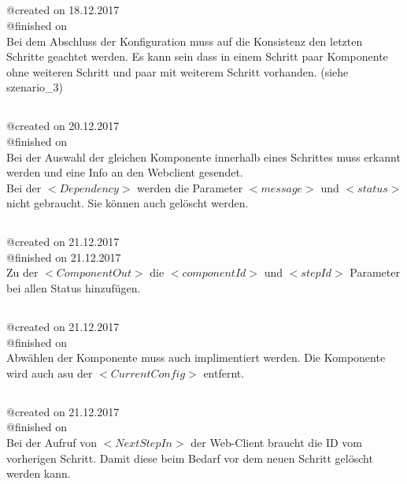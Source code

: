 \documentclass{article}
\begin{document}
\subsection{}
@created on 18.12.2017\\
@finished on \\

Bei dem Abschluss der Konfiguration muss auf die Konsistenz den letzten
Schritte geachtet werden. Es kann sein dass in einem Schritt paar Komponente
ohne weiteren Schritt und paar mit weiterem Schritt vorhanden. (siehe
szenario\_3)\\

\subsection{}
@created on 20.12.2017\\
@finished on \\

Bei der Auswahl der gleichen Komponente innerhalb eines Schrittes muss erkannt
werden und eine Info an den Webclient gesendet.\\

Bei der $<Dependency>$ werden die Parameter $<message>$ und $<status>$ nicht
gebraucht. Sie k\"onnen auch gel\"oscht werden.\\

\subsection{}
@created on 21.12.2017\\
@finished on 21.12.2017\\

Zu der $<ComponentOut>$ die $<componentId>$ und $<stepId>$ Parameter bei
allen Status hinzuf\"ugen.\\

\subsection{}
@created on 21.12.2017\\
@finished on \\

Abw\"ahlen der Komponente muss auch implimentiert werden. Die Komponente wird
auch asu der $<CurrentConfig>$ entfernt.\\

\subsection{}
@created on 21.12.2017\\
@finished on \\

Bei der Aufruf von $<NextStepIn>$ der Web-Client braucht die ID vom vorherigen
Schritt. Damit diese beim Bedarf vor dem neuen Schritt gel\"oscht werden kann.
\end{document}

